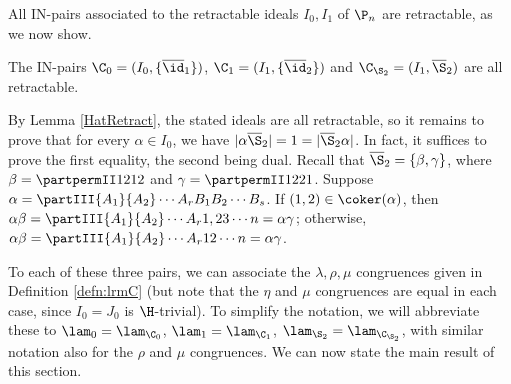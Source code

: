 %
%
%



All IN-pairs associated to the retractable ideals $I_0,I_1$ of $\P_n$ are retractable, as we now show.



\begin{lemma}
\label{ThreeTriples}
The IN-pairs $\C_0=(I_0,\{\overline{\id}_1\})$,
$\C_1=(I_1,\{\overline{\id}_2\})$ and
$\C_{\S_2}=(I_1,\overline{\S}_2)$ are all retractable.
\end{lemma}

\pf
By Lemma \ref{HatRetract}, the stated ideals are all retractable, so it remains to prove that for every $\alpha\in I_0$, we have
$|\alpha \overline{\S}_2|=1=|\overline{\S}_2\alpha|$. 
In fact, it suffices to prove the first equality, the second being dual.
Recall that $\overline{\S}_2=\{\beta,\gamma\}$,
where $\beta=\partpermII1212$ and $\gamma=\partpermII1221$.
Suppose $\alpha=\partIII{A_1}{A_2}\cdots{A_r}{B_1}{B_2}\cdots{B_s}$.
If $(1,2)\in\coker(\alpha)$, then
$\alpha\beta=\partIII{A_1}{A_2}\cdots{A_r}{1,2}{3}\cdots{n}=\alpha\gamma$; otherwise,
$\alpha\beta=\partIII{A_1}{A_2}\cdots{A_r}{1}{2}\cdots{n}=\alpha\gamma$.
\epf

To each of these three pairs, we can associate the $\lambda,\rho,\mu$ congruences given in Definition \ref{defn:lrmC} (but note that the $\eta$ and $\mu$ congruences are equal in each case, since $I_0=J_0$ is $\H$-trivial).  
%
To simplify the notation, we will abbreviate these to $\lam_0=\lam_{\C_0}$, $\lam_1=\lam_{\C_1}$, $\lam_{\S_2}=\lam_{\C_{\S_2}}$, with similar notation also for the $\rho$ and $\mu$ congruences.
%
We can now state the main result of this section.


